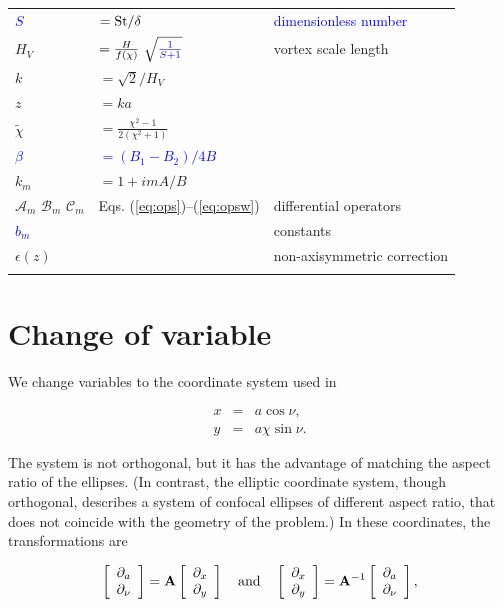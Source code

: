 \documentclass[apj]{emulateapj}
\newcommand{\vt}[1]{\mathbf{#1}}       %
\def\blue#1{\textcolor{blue}{#1}}
\newcommand{\Eqss}[2]{Eqs. (\ref{#1})--(\ref{#2})}
\newcommand{\eqss}[2]{\Eqss{#1}{#2}}
\newcommand{\beq}{\begin{equation}}
\newcommand{\eeq}{\end{equation}}
\newcommand{\beqn}{\begin{eqnarray}}
\newcommand{\eeqn}{\end{eqnarray}}
\newcommand{\tilchi}{\tilde\chi}
\newcommand{\St}{{\rm St}}
\begin{document}
\begin{table}
\begin{center}
\begin{tabular}{l l l}
\blue{$S$} & \blue{$= \St/\delta$} & \blue{dimensionless number} \\
$H_V$ & $=\frac{H}{f(\chi)} \ \sqrt{\blue{\frac{1}{S+1}}}$ & vortex scale length \\
$k$ & $=\sqrt{2}/H_V$ & \\ 
$z$ & $=ka$ & \\
$\tilchi$ & $=\frac{\chi^2-1}{2(\chi^2+1)}$ & \\
\blue{$\beta$} & \blue{$=(B_1-B_2)/4B$}& \\
$k_m$ & $= 1+imA/B$ & \\
$\mathcal{A}_m$ $\mathcal{B}_m$ $\mathcal{C}_m$  &\eqss{eq:ops}{eq:opsw} & differential operators \\
\blue{$b_m$} & & constants\\
$\epsilon(z)$ & & non-axisymmetric correction \\
 & & \\ \hline
\end{tabular}
\end{center}
\end{table}


\section{Change of variable}
\label{sect:coordinate-transformation}

We change variables to the coordinate system used in \citet{Chang-Oishi10}

\beqn
  x &=& a \cos\nu, \label{eq:change-x}\\
  y &=& a\chi\sin\nu.  \label{eq:change-y}
\eeqn

The system is not orthogonal, but it has the advantage of matching the
aspect ratio of the ellipses. (In contrast, the elliptic coordinate
system, though orthogonal, describes a system of confocal ellipses of
different aspect ratio, that does not coincide with the geometry of
the problem.) In these coordinates, the transformations are 

\beq
\left[\begin{array}{c}
    \partial_{a}  \\
    \partial_{\nu}
  \end{array}\right] = \vt{A} 
  \left[\begin{array}{c}
      \partial_{x}  \\
      \partial_{y}
    \end{array}\right] 
%
\quad {\rm and} \quad 
%
\left[\begin{array}{c}
    \partial_{x}  \\
    \partial_{y}
  \end{array}\right] = \vt{A}^{-1} 
  \left[\begin{array}{c}
      \partial_{a}  \\
      \partial_{\nu}
    \end{array}\right],  
%
\eeq
\end{document}
